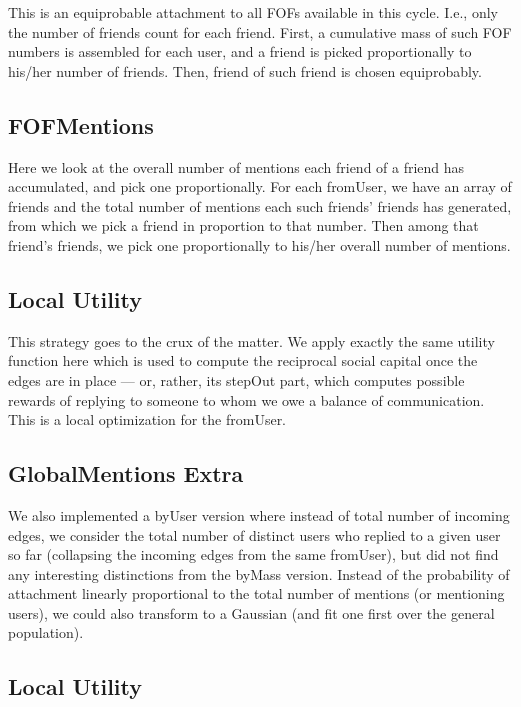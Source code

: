 \documentclass[10pt,oneside]{memoir}
\begin{document}
This is an equiprobable attachment to all FOFs available in this cycle.  I.e., only the number of friends count for each friend.  First, a cumulative mass of such FOF numbers is assembled for each user, and a friend is picked proportionally to his/her number of friends.  Then,  friend of such friend is chosen equiprobably.


\subsection{FOFMentions}
\label{fofmentions}

Here we look at the overall number of mentions each friend  of a friend has accumulated, and pick one proportionally.  For each fromUser, we have an array of friends and the total number of mentions each such friends' friends has generated, from which we pick a friend in proportion to that number.  Then among that friend's friends, we pick one proportionally to his/her overall number of mentions.


\subsection{Local Utility}
\label{localutility}

This strategy goes to the crux of the matter.  We apply exactly the same utility function here which is used to compute the reciprocal social capital once the edges are in place --- or, rather, its stepOut part, which computes possible rewards of replying to someone to whom we owe a balance of communication.  This is a local optimization for the fromUser. 


\subsection{GlobalMentions Extra}
\label{globalmentionsextra}

We also implemented a byUser version where instead of total number of incoming edges, we consider the total number of distinct users who replied to a given user so far (collapsing the incoming edges from the same fromUser), but did not find any interesting distinctions from the byMass version.
Instead of the probability of attachment linearly proportional to the total number of mentions (or mentioning users), we could also transform to a Gaussian (and fit one first over the general population).


\subsection{Local Utility}
\label{localutility}
\end{document}
